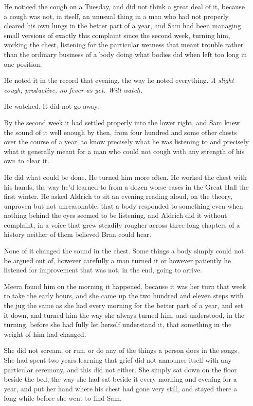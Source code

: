 He noticed the cough on a Tuesday, and did not think a great deal of it, because a cough was not, in itself, an unusual thing in a man who had not properly cleared his own lungs in the better part of a year, and Sam had been managing small versions of exactly this complaint since the second week, turning him, working the chest, listening for the particular wetness that meant trouble rather than the ordinary business of a body doing what bodies did when left too long in one position.

He noted it in the record that evening, the way he noted everything. \textit{A slight cough, productive, no fever as yet. Will watch.}

He watched. It did not go away.

\sceneBreak

By the second week it had settled properly into the lower right, and Sam knew the sound of it well enough by then, from four hundred and some other chests over the course of a year, to know precisely what he was listening to and precisely what it generally meant for a man who could not cough with any strength of his own to clear it.

He did what could be done. He turned him more often. He worked the chest with his hands, the way he’d learned to from a dozen worse cases in the Great Hall the first winter. He asked Aldrich to sit an evening reading aloud, on the theory, unproven but not unreasonable, that a body responded to something even when nothing behind the eyes seemed to be listening, and Aldrich did it without complaint, in a voice that grew steadily rougher across three long chapters of a history neither of them believed Bran could hear.

None of it changed the sound in the chest. Some things a body simply could not be argued out of, however carefully a man turned it or however patiently he listened for improvement that was not, in the end, going to arrive.

\sceneBreak

Meera found him on the morning it happened, because it was her turn that week to take the early hours, and she came up the two hundred and eleven steps with the jug the same as she had every morning for the better part of a year, and set it down, and turned him the way she always turned him, and understood, in the turning, before she had fully let herself understand it, that something in the weight of him had changed.

She did not scream, or run, or do any of the things a person does in the songs. She had spent two years learning that grief did not announce itself with any particular ceremony, and this did not either. She simply sat down on the floor beside the bed, the way she had sat beside it every morning and evening for a year, and put her hand where his chest had gone very still, and stayed there a long while before she went to find Sam.

